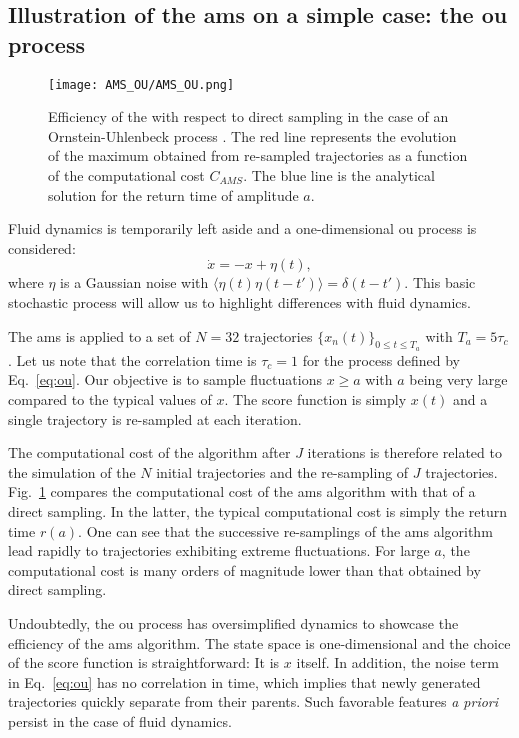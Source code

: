 \subsection{Illustration of the \ac{ams} on a simple case: the \acl{ou} process}
\label{app:AMS_on_OU}

\begin{figure}
  \centering
  \texttt{[image: AMS\_OU/AMS\_OU.png]}
  \caption{Efficiency of the  with respect to direct sampling in the case of an Ornstein-Uhlenbeck process \citep{lestang_computing_2018}. The red line represents the evolution of the maximum obtained from re-sampled trajectories as a function of the computational cost $C_{AMS}$. The blue line is the analytical solution for the return time of amplitude $a$.}
  \label{fig:comparaison_temps_de_retour}
\end{figure}
Fluid dynamics is temporarily left aside and a one-dimensional \acl{ou} process is considered:
\begin{equation}
  \label{eq:ou}
  \dot{x} = -x + \eta (t),
\end{equation}
where $\eta$ is a Gaussian noise with $\langle \eta(t)\eta(t-t')\rangle = \delta(t-t')$.
This basic stochastic process will allow us to highlight differences with fluid dynamics.


The \ac{ams} is applied  to a set of $N=32$ trajectories $\{x_n(t)\}_{0\leq t \leq T_a}$ with $T_a=5\tau_c$.
Let us note that the correlation time is $\tau_c = 1$ for the process defined by Eq.~\eqref{eq:ou}.
Our objective is to sample fluctuations $x\geq a$ with $a$ being very large compared to the typical values of $x$.
The score function is simply $x(t)$ and a single trajectory is re-sampled at each iteration.

The computational cost of the algorithm after $J$ iterations is therefore related to the simulation of the $N$ initial trajectories and the re-sampling of $J$ trajectories.
Fig.~\ref{fig:comparaison_temps_de_retour} compares the computational cost of the \ac{ams} algorithm with that of a direct sampling.
In the latter, the typical computational cost is simply the return time $r(a)$.
One can see that the successive re-samplings of the \ac{ams} algorithm lead rapidly to trajectories exhibiting extreme fluctuations.
For large $a$, the computational cost is many orders of magnitude lower than that obtained by direct sampling.

Undoubtedly, the \acl{ou} process has oversimplified dynamics to showcase the efficiency of the \ac{ams} algorithm.
The state space is one-dimensional and the choice of the score function is straightforward: It is $x$ itself.
In addition, the noise term in Eq.~\eqref{eq:ou} has no correlation in time, which implies that newly generated trajectories quickly separate from their parents. Such favorable features  \textit{a priori} persist in the case of fluid dynamics.
  
